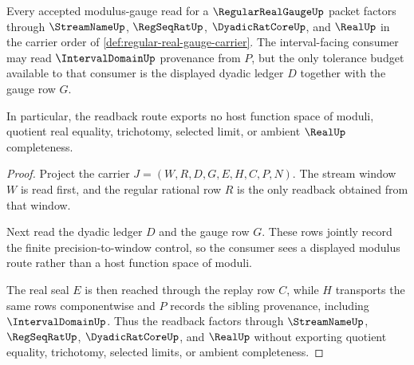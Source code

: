 \begin{theorem}
\label{thm:regular-real-gauge-modulus-readback}
Every accepted modulus-gauge read for a $\RegularRealGaugeUp$ packet factors through $\StreamNameUp$, $\RegSeqRatUp$, $\DyadicRatCoreUp$, and $\RealUp$ in the carrier order of \autoref{def:regular-real-gauge-carrier}. The interval-facing consumer may read $\IntervalDomainUp$ provenance from $P$, but the only tolerance budget available to that consumer is the displayed dyadic ledger $D$ together with the gauge row $G$.

In particular, the readback route exports no host function space of moduli, quotient real equality, trichotomy, selected limit, or ambient $\RealUp$ completeness.
\end{theorem}
\begin{proof}
Project the carrier $J=(W,R,D,G,E,H,C,P,N)$. The stream window $W$ is read first, and the regular rational row $R$ is the only readback obtained from that window.

Next read the dyadic ledger $D$ and the gauge row $G$. These rows jointly record the finite precision-to-window control, so the consumer sees a displayed modulus route rather than a host function space of moduli.

The real seal $E$ is then reached through the replay row $C$, while $H$ transports the same rows componentwise and $P$ records the sibling provenance, including $\IntervalDomainUp$. Thus the readback factors through $\StreamNameUp$, $\RegSeqRatUp$, $\DyadicRatCoreUp$, and $\RealUp$ without exporting quotient equality, trichotomy, selected limits, or ambient completeness.
\end{proof}

\begin{closurestatus}{\RegularRealGaugeUp}
  \theoryclosure{\seedClosure}
  \formalstatus{\unformalizedV}
\end{closurestatus}
